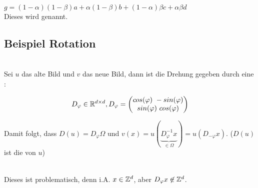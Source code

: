 \begin{minipage}[t]{0.59\linewidth}
\begin{center}
                            \small{$g=(1-\alpha)  (1-\beta)  a + \alpha  (1- \beta)  b + (1-\alpha)  \beta  c + \alpha  \beta  d$}\\
                            Dieses wird  genannt.
                    \end{center}
                \end{minipage}

    \subsection{Beispiel Rotation}
        \begin{center}
        \end{center}

        \\
            Sei $u$ das alte Bild und $v$ das neue Bild, dann ist die Drehung gegeben durch eine :

            \[D_\varphi \in \R^{d \times d}, D_\varphi=\mat{cos(\varphi) \ -sin(\varphi) \\ sin(\varphi) \ cos(\varphi)}\]

            Damit folgt, dass $D(u)= D_\varphi \Omega$ und $v(x)=u(\underbrace{D_\varphi^{-1}x}_{\in \Omega}) = u(D_{-\varphi}x)$. ($D(u)$ ist die  von $u$)

        \\
            Dieses ist problematisch, denn i.A. $x \in \mathbb Z^d$, aber $D_\varphi x \not \in \mathbb Z^d$.

